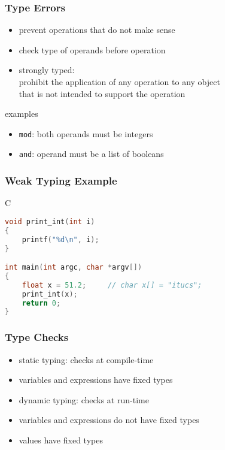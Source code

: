 \documentclass[dvipsnames]{beamer}
\theoremstyle{plain}
\begin{document}
\begin{frame}
  \frametitle{Type Errors}

  \begin{itemize}
    \item prevent operations that do not make sense
    \item check type of operands before operation

    \medskip
    \item \alert{strongly typed}:\\
      prohibit the application of any operation to any object\\
      that is not intended to support the operation
  \end{itemize}

  \pause
  \begin{exampleblock}{examples}
    \begin{itemize}
      \item \lstinline|mod|: both operands must be integers
      \item \lstinline|and|: operand must be a list of booleans
    \end{itemize}
  \end{exampleblock}
\end{frame}

\begin{frame}[fragile]
  \frametitle{Weak Typing Example}

  \begin{exampleblock}{C}
    \begin{lstlisting}[language=C]
void print_int(int i)
{
    printf("%d\n", i);
}

int main(int argc, char *argv[])
{
    float x = 51.2;     // char x[] = "itucs";
    print_int(x);
    return 0;
}
    \end{lstlisting}
  \end{exampleblock}
\end{frame}

\begin{frame}
  \frametitle{Type Checks}

  \begin{itemize}
    \item \alert{static} typing: checks at compile-time
    \item variables and expressions have fixed types

    \bigskip
    \item \alert{dynamic} typing: checks at run-time
    \item variables and expressions do not have fixed types
    \item values have fixed types
  \end{itemize}
\end{frame}
\end{document}
